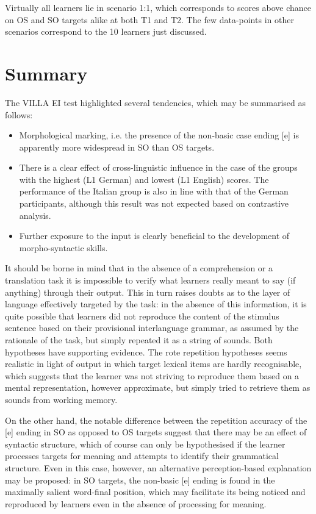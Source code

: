 Virtually all learners lie in scenario 1:1, which corresponds to scores above chance on OS and SO targets alike at both T1 and T2. The few data-points in other scenarios correspond to the 10 learners just discussed.

\section{Summary}\label{sec:04:3}

The VILLA EI test highlighted several tendencies, which may be summarised as follows:

\begin{itemize}
    \item Morphological marking, i.e. the presence of the non-basic case ending [e] is apparently more widespread in SO than OS targets.
    \item There is a clear effect of cross-linguistic influence in the case of the groups with the highest (L1 German) and lowest (L1 English) scores. The performance of the Italian group is also in line with that of the German participants, although this result was not expected based on contrastive analysis.
    \item Further exposure to the input is clearly beneficial to the development of morpho-syntactic skills.
\end{itemize}

It should be borne in mind that in the absence of a comprehension or a translation task it is impossible to verify what learners really meant to say (if anything) through their output. This in turn raises doubts as to the layer of language effectively targeted by the task: in the absence of this information, it is quite possible that learners did not reproduce the content of the stimulus sentence based on their provisional interlanguage grammar, as assumed by the rationale of the task, but simply repeated it as a string of sounds. Both hypotheses have supporting evidence. The rote repetition hypotheses seems realistic in light of output in which target lexical items are hardly recognisable, which suggests that the learner was not striving to reproduce them based on a mental representation, however approximate, but simply tried to retrieve them as sounds from working memory.

On the other hand, the notable difference between the repetition accuracy of the [e] ending in SO as opposed to OS targets suggest that there may be an effect of syntactic structure, which of course can only be hypothesised if the learner processes targets for meaning and attempts to identify their grammatical structure. Even in this case, however, an alternative perception-based explanation may be proposed: in SO targets, the non-basic [e] ending is found in the maximally salient word-final position, which may facilitate its being noticed and reproduced by learners even in the absence of processing for meaning.

